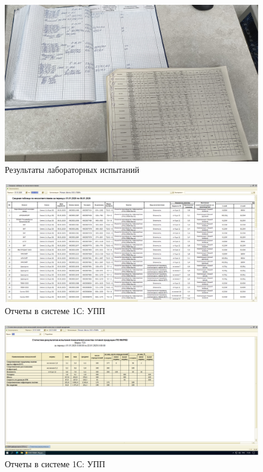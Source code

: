 \begin{figure}
\begin{center}
 \includegraphics[height=0.4\textheight, keepaspectratio]{Pics/VIII Задание и журнал.jpg}
\end{center}
 \caption{Результаты лабораторных испытаний}
 \label{pic:/VIII Задание и журнал}
\end{figure}

\begin{figure}
\begin{center}
 \includegraphics[height=0.3\textheight, keepaspectratio]{Pics/VIIIотчет1.png}
\end{center}
 \caption{Отчеты в системе 1С: УПП}
 \label{pic:/VIIIотчет1}
\end{figure}

\begin{figure}
\begin{center}
 \includegraphics[height=0.3\textheight, keepaspectratio]{Pics/VIIIотчет2.png}
\end{center}
 \caption{Отчеты в системе 1С: УПП}
 \label{pic:/VIIIотчет2}
\end{figure}

